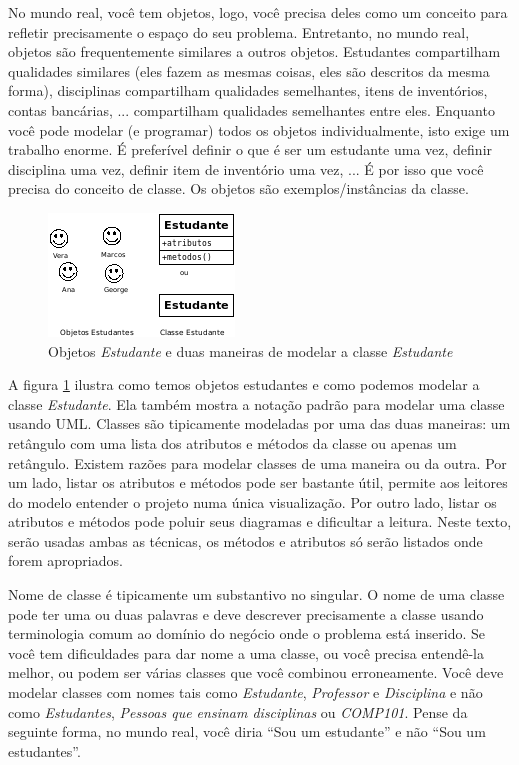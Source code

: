 \documentclass[
	11pt,				%
	openright,
	twoside,			%
	a4paper,			%
	english,			%
	french,
	brazil,				%
	sumario=tradicional
	]{abntex2}
\begin{document}
No mundo real, você tem objetos, logo, você precisa deles como um conceito para refletir precisamente o espaço do seu problema. Entretanto, no mundo real, objetos são frequentemente similares a outros objetos. Estudantes compartilham qualidades similares (eles fazem as mesmas coisas, eles são descritos da mesma forma), disciplinas compartilham qualidades semelhantes, itens de  inventórios, contas bancárias, ... compartilham qualidades semelhantes entre eles. Enquanto você pode modelar (e programar) todos os objetos individualmente, isto exige um trabalho enorme. É preferível definir o que é ser um estudante uma vez, definir disciplina uma vez, definir item de inventório uma vez, ... É por isso que você precisa do conceito de classe. Os objetos são exemplos/instâncias da classe.

\begin{figure}[h]
\begin{center}
\includegraphics[scale=1]{objClassStdt.png} 
\caption[Objetos e Classe \emph{Estudante}]{Objetos \emph{Estudante} e duas maneiras de modelar a classe \emph{Estudante}} \label{fig:objStdt}
\end{center}
\end{figure}

A figura \ref{fig:objStdt} ilustra como temos objetos estudantes e como podemos modelar a classe \emph{Estudante}. Ela também mostra a notação padrão para modelar uma classe usando UML. Classes são tipicamente modeladas por uma das duas maneiras: um retângulo com uma lista dos atributos e métodos da classe ou apenas um retângulo. Existem razões para modelar classes de uma maneira ou da outra. Por um lado, listar os atributos e métodos pode ser bastante útil, permite aos leitores do modelo entender o projeto numa única visualização. Por outro lado, listar os atributos e métodos pode poluir seus diagramas e dificultar a leitura. Neste texto, serão usadas ambas as técnicas, os métodos e atributos só serão listados onde forem apropriados.

Nome de classe é tipicamente um substantivo no singular. O nome de uma classe pode ter uma ou duas palavras e deve descrever precisamente a classe usando terminologia comum ao domínio do negócio onde o problema está inserido. Se você tem dificuldades para dar nome a uma classe, ou você precisa entendê-la melhor, ou podem ser várias classes que você combinou erroneamente. Você deve modelar classes com nomes tais como \emph{Estudante}, \emph{Professor} e \emph{Disciplina} e não como \textit{Estudantes}, \textit{Pessoas que ensinam disciplinas} ou \textit{COMP101}. Pense da seguinte forma, no mundo real, você diria ``Sou um estudante'' e não ``Sou um estudantes''.
\end{document}

